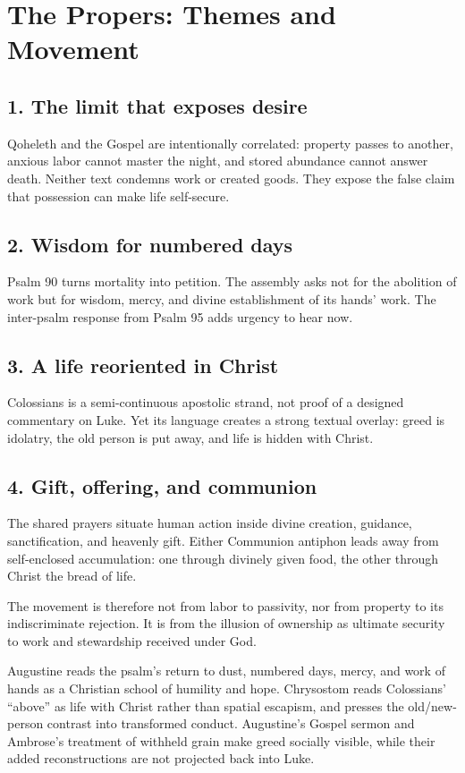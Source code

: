 \label{triptych:brief-synthesis:start}
\section*{The Propers: Themes and Movement}
\subsection*{1. The limit that exposes desire}
Qoheleth and the Gospel are intentionally correlated: property passes to
another, anxious labor cannot master the night, and stored abundance cannot
answer death. Neither text condemns work or created goods. They expose the
false claim that possession can make life self-secure.
\subsection*{2. Wisdom for numbered days}
Psalm 90 turns mortality into petition. The assembly asks not for the
abolition of work but for wisdom, mercy, and divine establishment of its
hands' work. The inter-psalm response from Psalm 95 adds urgency to hear now.
\subsection*{3. A life reoriented in Christ}
Colossians is a semi-continuous apostolic strand, not proof of a designed
commentary on Luke. Yet its language creates a strong textual overlay:
greed is idolatry, the old person is put away, and life is hidden with Christ.
\subsection*{4. Gift, offering, and communion}
The shared prayers situate human action inside divine creation, guidance,
sanctification, and heavenly gift. Either Communion antiphon leads away from
self-enclosed accumulation: one through divinely given food, the other through
Christ the bread of life.

\clearpage
The movement is therefore not from labor to passivity, nor from property to
its indiscriminate rejection. It is from the illusion of ownership as
ultimate security to work and stewardship received under God.

Augustine reads the psalm's return to dust, numbered days, mercy, and work of
hands as a Christian school of humility and hope. Chrysostom reads Colossians'
``above'' as life with Christ rather than spatial escapism, and presses the
old/new-person contrast into transformed conduct. Augustine's Gospel sermon
and Ambrose's treatment of withheld grain make greed socially visible, while
their added reconstructions are not projected back into Luke.


